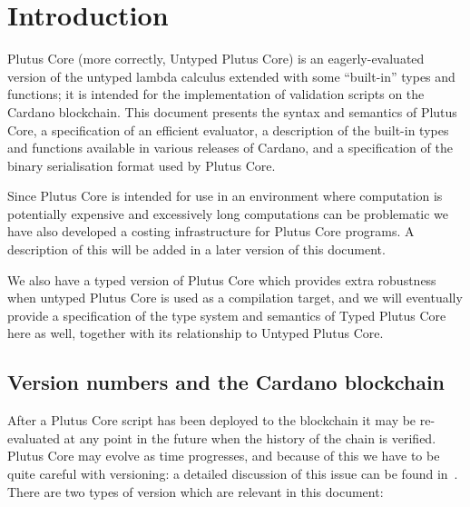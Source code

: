 \section{Introduction}
\label{sec:introduction}
Plutus Core (more correctly, Untyped Plutus Core) is an eagerly-evaluated
version of the untyped lambda calculus extended with some ``built-in'' types and
functions; it is intended for the implementation of validation scripts on the
Cardano blockchain.  This document presents the syntax and semantics of Plutus
Core, a specification of an efficient evaluator, a description of the built-in
types and functions available in various releases of Cardano, and
a specification of the binary serialisation format used by Plutus Core.

Since Plutus Core is intended for use in an environment where
computation is potentially expensive and excessively long computations can be
problematic we have also developed a costing infrastructure for Plutus Core
programs. A description of this will be added in a later version of this
document.

We also have a typed version of Plutus Core which provides extra robustness when
untyped Plutus Core is used as a compilation target, and we will eventually
provide a specification of the type system and semantics of Typed Plutus Core
here as well, together with its relationship to Untyped Plutus Core.

\subsection{Version numbers and the Cardano blockchain}
\label{sec:version-numbers}
After a Plutus Core script has been deployed to the blockchain it may be
re-evaluated at any point in the future when the history of the chain is
verified.  Plutus Core may evolve as time progresses, and because of this we
have to be quite careful with versioning: a detailed discussion of this issue
can be found in~\cite{CIP-35}.  There are two types of version which are
relevant in this document:

